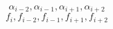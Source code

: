 \begin{equation} 
\alpha_{{i-2}} , \alpha_{{i-1}} , \alpha_{{i+1}} , \alpha_{{i+2}}
 \end{equation} 
\begin{equation} 
f_{i} , f_{{i-2}} , f_{{i-1}} , f_{{i+1}} , f_{{i+2}}
 \end{equation}